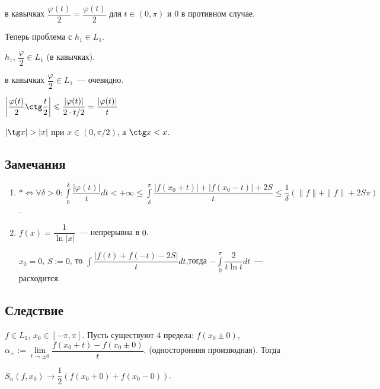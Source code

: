 \documentclass{article}
\begin{document}
            в кавычках $\dfrac{\varphi(t)}{2} = \dfrac{\varphi(t)}{2}$ для $t \in (0, \pi)$ и 0 в противном случае.
            
            Теперь проблема с $h_1 \in L_1$.
            
            $h_1$, $\dfrac{\varphi}{2} \in L_1$ (в кавычках).
            
            в кавычках $\dfrac{\varphi}{2} \in L_1$~--- очевидно.
            
            $\left| \dfrac{\varphi(t)}{2} \ctg \dfrac{t}{2} \right| \leqslant \dfrac{| \varphi(t) |}{2 \cdot t / 2} = \dfrac{| \varphi(t) |}{t}$
            
            $| \tg x | > |x|$ при $x \in (0, \pi / 2)$, а $\ctg x < x$.
        
        \subsection{Замечания}
        
            \begin{enumerate}
            
                \item $* \Leftrightarrow \forall \delta > 0 : \int\limits^{\delta}_0 \dfrac{|\varphi(t)|}{t} dt < +\infty \leqslant \int\limits^{\pi}_{\delta} \dfrac{|f(x_0 + t)| + |f(x_0 - t)| + 2S}{t} \leqslant \dfrac{1}{\delta} \left( \| f \| + \| f \| + 2 S \pi \right)$.
                
                \item $f(x) = \dfrac{1}{\ln |x|}$~--- непрерывна в $0$.
                
                    $x_0 = 0$, $S := 0$, то $\int \dfrac{| f(t) + f(-t) - 2S|}{t} dt$,тогда $-\int\limits^{\pi}_0 \dfrac{2}{t \ln t} dt$~--- расходится.
                
            \end{enumerate}
            
        \subsection{Следствие}
            
            $f \in L_1$, $x_0 \in [-\pi, \pi]$. Пусть существуют $4$ предела: $f(x_0 \pm 0)$, $\alpha_{\pm} := \lim\limits_{t \rightarrow \pm 0} \dfrac{f(x_0 + t) - f(x_0 \pm 0)}{t}$. (односторонняя производная). Тогда
            
            $S_n(f, x_0) \rightarrow \dfrac{1}{2} \left( f(x_0 + 0) + f(x_0 - 0) \right)$.
            
\end{document}
